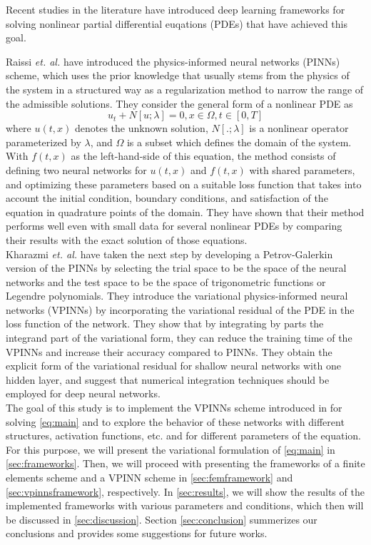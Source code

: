 Recent studies in the literature have introduced deep learning frameworks for solving nonlinear partial differential
euqations (PDEs) that have achieved this goal.

Raissi \textit{et. al.} \cite{RAISSI2019686} have introduced the physics-informed neural networks (PINNs) scheme,
which uses the prior knowledge that usually stems from the physics of the system in a structured way as a regularization
method to narrow the range of the admissible solutions. They consider the general form of a nonlinear PDE as
\begin{equation}
    u_t + N[u; \lambda] = 0, x \in \Omega, t \in [0, T]
\end{equation}
where $u(t, x)$ denotes the unknown solution, $N[.; \lambda]$ is a nonlinear operator parameterized by $\lambda$,
and $\Omega$ is a subset which defines the domain of the system. With $f(t, x)$ as the left-hand-side of this equation,
the method consists of defining two neural networks for $u(t, x)$ and $f(t, x)$ with shared parameters,
and optimizing these parameters based on a suitable loss function that takes into account the initial condition,
boundary conditions, and satisfaction of the equation in quadrature points of the domain. They have shown that their
method performs well even with small data for several nonlinear PDEs by comparing their results with the exact solution
of those equations.\\

Kharazmi \textit{et. al.} \cite{kharazmi2019variational} have taken the next step by developing a Petrov-Galerkin
version of the PINNs by selecting the trial space to be the space of the neural networks and the test space to be the
space of trigonometric functions or Legendre polynomials. They introduce the variational physics-informed neural networks
(VPINNs) by incorporating the variational residual of the PDE in the loss function of the network. They show that by
integrating by parts the integrand part of the variational form, they can reduce the training time of the VPINNs and
increase their accuracy compared to PINNs. They obtain the explicit form of the variational residual for shallow neural
networks with one hidden layer, and suggest that numerical integration techniques should be employed for deep neural
networks.\\

The goal of this study is to implement the VPINNs scheme introduced in \cite{kharazmi2019variational} for solving
\autoref{eq:main} and to explore the behavior of these networks with different structures, activation functions, etc.
and for different parameters of the equation.
For this purpose, we will present the variational formulation of \autoref{eq:main} in \autoref{sec:frameworks}.
Then, we will proceed with presenting the frameworks of a finite elements scheme and a VPINN scheme in \autoref{sec:femframework}
and \autoref{sec:vpinnsframework}, respectively. In \autoref{sec:results}, we will show the results of the implemented frameworks with various
parameters and conditions, which then will be discussed in \autoref{sec:discussion}. Section \ref{sec:conclusion} summerizes our conclusions and
provides some suggestions for future works.

